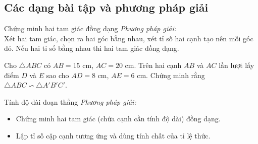 \subsection{Các dạng bài tập và phương pháp giải}
\begin{dang}{Chứng minh hai tam giác đồng dạng}
	\emph{Phương pháp giải:}\\
	Xét hai tam giác, chọn ra hai góc bằng nhau, xét tỉ số hai cạnh tạo nên mỗi góc đó. Nếu hai tỉ số bằng nhau thì hai tam giác đồng dạng.
\end{dang}
\begin{vd}%
	Cho $\triangle ABC$ có $AB = 15$ cm, $AC = 20$ cm. Trên hai cạnh $ AB $ và $ AC $ lần lượt lấy điểm $ D $ và $ E $ sao cho $ AD=8 $ cm, $ AE=6 $ cm. Chứng minh rằng $\triangle ABC\backsim\triangle A'B'C'$.
\end{vd}
\begin{dang}{Tính độ dài đoạn thẳng}
	\emph{Phương pháp giải:}
	\begin{itemize}
		\item Chứng minh hai tam giác (chứa cạnh cần tính độ dài) đồng dạng.
		\item Lập tỉ số cặp cạnh tương ứng và dùng tính chất của tỉ lệ thức.
	\end{itemize}
\end{dang}
